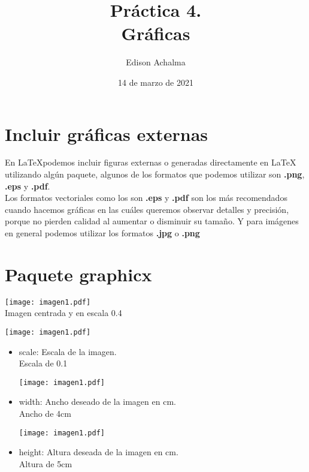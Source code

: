 \documentclass[12pt]{article}
\begin{document}
\title{Práctica 4. \\ Gráficas}
\author{Edison Achalma}
\date{14 de marzo de 2021}
\maketitle
\tableofcontents

\section{Incluir gráficas externas}
En \LaTeX podemos incluir figuras externas o generadas directamente en \LaTeX \, utilizando algún paquete, algunos de los formatos que podemos utilizar son \textbf{.png}, \textbf{.eps} y \textbf{.pdf}. \\[0.5cm]
Los formatos vectoriales como los son \textbf{.eps} y \textbf{.pdf} son los más recomendados cuando hacemos gráficas en las cuáles queremos observar detalles y precisión, porque no pierden calidad al aumentar o disminuir su tamaño. Y para imágenes en general podemos utilizar los formatos \textbf{.jpg} o \textbf{.png}

\section{Paquete graphicx}
\texttt{[image: imagen1.pdf]} \\

Imagen centrada y en escala 0.4
\begin{center}
\texttt{[image: imagen1.pdf]}
\end{center}

\begin{itemize}
\item  scale: Escala de la imagen. \\ Escala de 0.1

\begin{center}
\texttt{[image: imagen1.pdf]}
\end{center}

\item width: Ancho deseado de la imagen en cm. \\ Ancho de 4cm

\begin{center}
\texttt{[image: imagen1.pdf]}
\end{center}

\item height: Altura deseada de la imagen en cm. \\ Altura de 5cm
\end{itemize}
\end{document}
